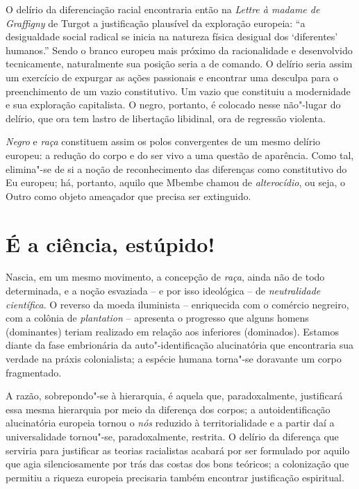 O delírio da diferenciação racial encontraria então na \emph{Lettre à
madame de Graffigny} de Turgot a justificação plausível da exploração
europeia: ``a desigualdade social
radical se inicia na natureza física desigual dos `diferentes'
humanos.'' Sendo o branco europeu mais próximo da
racionalidade e desenvolvido tecnicamente, naturalmente sua posição
seria a de comando. O delírio seria assim um exercício de expurgar as
ações passionais e encontrar uma desculpa para o preenchimento de um
vazio constitutivo. Um vazio que constituiu a modernidade e sua
exploração capitalista. O negro, portanto, é colocado nesse não"-lugar do
delírio, que ora tem lastro de libertação libidinal, ora de regressão
violenta.

\emph{Negro} e \emph{raça} constituem assim os polos convergentes de um
mesmo delírio europeu: a redução do corpo e do ser vivo a uma questão de
aparência. Como tal, elimina"-se de si a noção de reconhecimento das
diferenças como constitutivo do Eu europeu; há, portanto, aquilo que
Mbembe chamou de \emph{alterocídio}, ou seja, o Outro como objeto
ameaçador que precisa ser extinguido.

\chapter{É a ciência, estúpido!}

Nascia, em um mesmo movimento, a concepção de \emph{raça}, ainda não de
todo determinada, e a noção esvaziada -- e por isso ideológica -- de
\emph{neutralidade científica}. O reverso da moeda iluminista --
enriquecida com o comércio negreiro, com a colônia de \emph{plantation}
-- apresenta o progresso que alguns homens (dominantes) teriam realizado
em relação aos inferiores (dominados). Estamos diante da fase
embrionária da auto"-identificação alucinatória que encontraria sua
verdade na práxis colonialista; a espécie humana torna"-se doravante um
corpo fragmentado.

A razão, sobrepondo"-se à hierarquia, é aquela que, paradoxalmente,
justificará essa mesma hierarquia por meio da diferença dos corpos; a
autoidentificação alucinatória europeia tornou o \emph{nós} reduzido à
territorialidade e a partir daí a universalidade tornou"-se,
paradoxalmente, restrita. O delírio da diferença que serviria para
justificar as teorias racialistas acabará por ser formulado por aquilo
que agia silenciosamente por trás das costas dos bons teóricos; a
colonização que permitiu a riqueza europeia precisaria também encontrar
justificação espiritual.

